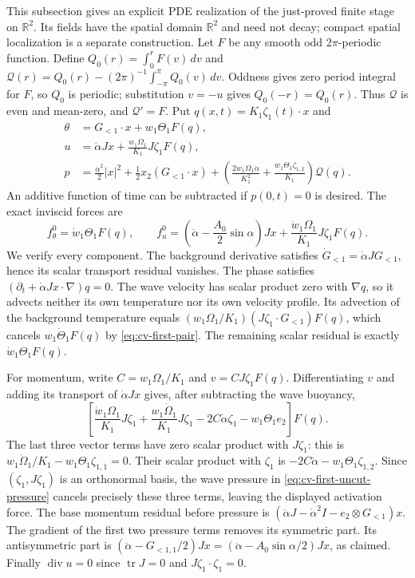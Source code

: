 This subsection gives an explicit PDE realization of the just-proved
finite stage on $\mathbb R^2$. Its fields have the spatial domain
$\mathbb R^2$ and need not decay; compact spatial localization is a
separate construction. Let $F$ be any smooth odd $2\pi$-periodic
function. Define $Q_0(r)=\int_0^rF(v)\,dv$ and
$\mathcal Q(r)=Q_0(r)-(2\pi)^{-1}\int_{-\pi}^{\pi}Q_0(v)\,dv$.
Oddness gives zero period integral for $F$, so $Q_0$ is periodic;
substitution $v=-u$ gives $Q_0(-r)=Q_0(r)$. Thus $\mathcal Q$ is
even and mean-zero, and $\mathcal Q'=F$.
Put $q(x,t)=K_1\zeta_1(t)\cdot x$ and
\begin{align}
 \theta&=G_{<1}\cdot x+w_1\Theta_1F(q),\nonumber\\
 u&=\dot\alpha Jx+\frac{w_1\Omega_1}{K_1}J\zeta_1F(q),
 \label{eq:cv-first-uncut-fields}\\
 p&=\frac{\dot\alpha^2}2|x|^2
      +\frac12x_2(G_{<1}\cdot x)
      +\left(\frac{2w_1\Omega_1\dot\alpha}{K_1^2}
             +\frac{w_1\Theta_1\zeta_{1,2}}{K_1}\right)\mathcal Q(q).
 \label{eq:cv-first-uncut-pressure}
\end{align}
An additive function of time can be subtracted if $p(0,t)=0$ is desired.
The exact inviscid forces are
\begin{equation}
 f_\theta^0=\dot w_1\Theta_1F(q),\qquad
 f_u^0=\left(\ddot\alpha-\frac{A_0}2\sin\alpha\right)Jx
                   +\frac{\dot w_1\Omega_1}{K_1}J\zeta_1F(q).
 \label{eq:cv-first-uncut-forces}
\end{equation}
We verify every component. The background derivative satisfies
$\dot G_{<1}=\dot\alpha JG_{<1}$, hence its scalar transport
residual vanishes. The phase satisfies
$(\partial_t+\dot\alpha Jx\cdot\nabla)q=0$.
The wave velocity has scalar product zero with $\nabla q$, so it
advects neither its own temperature nor its own velocity profile.
Its advection of the background temperature equals
$(w_1\Omega_1/K_1)(J\zeta_1\cdot G_{<1})F(q)$,
which cancels $w_1\dot\Theta_1F(q)$ by
\eqref{eq:cv-first-pair}. The remaining scalar residual is exactly
$\dot w_1\Theta_1F(q)$.

For momentum, write $C=w_1\Omega_1/K_1$ and
$v=CJ\zeta_1F(q)$. Differentiating $v$ and adding its transport
of $\dot\alpha Jx$ gives, after subtracting the wave buoyancy,
\[
 \left[\frac{\dot w_1\Omega_1}{K_1}J\zeta_1
   +\frac{w_1\dot\Omega_1}{K_1}J\zeta_1
   -2C\dot\alpha\zeta_1-w_1\Theta_1e_2\right]F(q).
\]
The last three vector terms have zero scalar product with $J\zeta_1$:
this is $w_1\dot\Omega_1/K_1-w_1\Theta_1\zeta_{1,1}=0$.
Their scalar product with $\zeta_1$ is
$-2C\dot\alpha-w_1\Theta_1\zeta_{1,2}$.
Since $(\zeta_1,J\zeta_1)$ is an orthonormal basis, the wave pressure
in \eqref{eq:cv-first-uncut-pressure} cancels precisely these three
terms, leaving the displayed activation force. The base momentum
residual before pressure is
$(\ddot\alpha J-\dot\alpha^2I-e_2\otimes G_{<1})x$.
The gradient of the first two pressure terms removes its symmetric
part. Its antisymmetric part is
$(\ddot\alpha-G_{<1,1}/2)Jx
=(\ddot\alpha-A_0\sin\alpha/2)Jx$, as claimed.
Finally $\operatorname{div}u=0$ since $\operatorname{tr}J=0$
and $J\zeta_1\cdot\zeta_1=0$.

